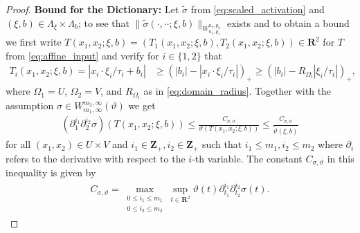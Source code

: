 \documentclass[a4paper]{article}
\newcommand{\rr}[1]{\mathbf{R}^{#1}}
\newcommand{\zzp}[1]{\mathbf{Z}_+^{#1}}
\newcommand{\abs}[1]{| #1|}     %
\newcommand{\norm}[2]{\|#1\|_{#2}}
\numberwithin{equation}{section}
\theoremstyle{remark}
\begin{document}
\begin{proof}
    \textbf{Bound for the Dictionary:} Let $\tilde{\sigma}$
    from \eqref{eq:scaled_activation} and $(\xi,b)\in\Lambda_\xi\times\Lambda_b$;
    to see that $\norm{\tilde{\sigma}(\cdot,\cdot\cdot;\xi,b)}{W_{n_1,p_1}^{n_2,p_2}}$
    exists and to obtain a bound
    we first write $T\left(x_1,x_2;\xi,b\right)=(T_1\left(x_1,x_2;\xi,b\right),T_2\left(x_1,x_2;\xi,b\right))\in\rr{2}$ for $T$ from \cref{eq:affine_input}
    and verify for $i \in \{1,2\}$ that
    \begin{align}
    \label{eq:activation_arg_bound}
        T_i\left(x_1,x_2;\xi,b\right)
        =\abs{x_i\cdot\xi_i/\tau_i+b_i}
        &\geq \left(\abs{b_i}-\abs{x_i\cdot\xi_i/\tau_i}\right)_+
        \geq \left(\abs{b_i}-R_{\Omega_i}\abs{\xi_i/\tau_i}\right)_+,
    \end{align}
    where $\Omega_1=U$, $\Omega_2=V$,
    and $R_{\Omega_i}$ as in \cref{eq:domain_radius}.
    Together with the assumption $\sigma\in W_{m_1,\infty}^{m_2,\infty}(\vartheta)$
    we get
    \begin{align*}
        \left(\partial_1^{i_1}\partial_2^{i_2}\sigma\right)(T\left(x_1,x_2;\xi,b\right))
        \leq\frac{C_{\sigma,\vartheta}}{\vartheta(T\left(x_1,x_2;\xi,b\right))}
        \leq\frac{C_{\sigma,\vartheta}}{\tilde{\vartheta}(\xi,b)}
    \end{align*}
    for all $(x_1,x_2)\in U\times V$ and
    $i_1\in\zzp{}, i_2\in\zzp{}$ such that $i_1\leq m_1, i_2\leq m_2$
    where $\partial_i$ refers to the derivative with respect to the $i$-{th}
    variable.
    The constant $C_{\sigma,\vartheta}$ in this inequality is given by
    \begin{align*}
        C_{\sigma,\vartheta}
            =   \max_{\substack{0\leq i_1\leq m_1\\0\leq i_2\leq m_2}}
                \sup_{t\in\rr{2}}
                \vartheta(t)
                \partial_{t_1}^{i_1}\partial_{t_2}^{i_2}\sigma(t).
    \end{align*}
    

\end{proof}
\end{document}
